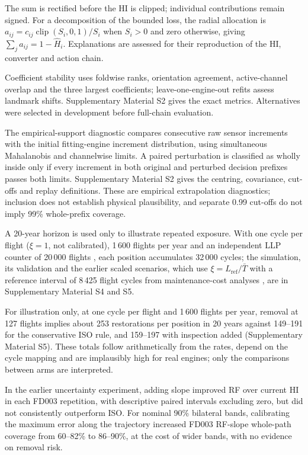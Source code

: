 \documentclass[12pt]{article}
\begin{document}
The sum is rectified before the HI is clipped; individual contributions remain signed. For a decomposition of the bounded loss, the radial allocation is $a_{ij}=c_{ij}\operatorname{clip}(S_i,0,1)/S_i$ when $S_i>0$ and zero otherwise, giving $\sum_j a_{ij}=1-\widehat H_i$. Explanations are assessed for their reproduction of the HI, converter and action chain.

Coefficient stability uses foldwise ranks, orientation agreement, active-channel overlap and the three largest coefficients; leave-one-engine-out refits assess landmark shifts. Supplementary Material S2 gives the exact metrics. Alternatives were selected in development before full-chain evaluation.

The empirical-support diagnostic compares consecutive raw sensor increments with the initial fitting-engine increment distribution, using simultaneous Mahalanobis \cite{Mahalanobis1936} and channelwise limits. A paired perturbation is classified as wholly inside only if every increment in both original and perturbed decision prefixes passes both limits. Supplementary Material S2 gives the centring, covariance, cut-offs and replay definitions. These are empirical extrapolation diagnostics; inclusion does not establish physical plausibility, and separate 0.99 cut-offs do not imply 99\% whole-prefix coverage.

A 20-year horizon is used only to illustrate repeated exposure. With one cycle per flight ($\xi=1$, not calibrated), 1\,600 flights per year and an independent LLP counter of 20\,000 flights \cite{AC33701}, each position accumulates 32\,000 cycles; the simulation, its validation and the earlier scaled scenarios, which use $\xi=L_{\mathrm{ref}}/\bar T$ with a reference interval of 8\,425 flight cycles from maintenance-cost analyses \cite{AC2003,AC2005,AC2019}, are in Supplementary Material S4 and S5.

For illustration only, at one cycle per flight and 1\,600 flights per year, removal at 127 flights implies about 253 restorations per position in 20 years against 149--191 for the conservative ISO rule, and 159--197 with inspection added (Supplementary Material S5). These totals follow arithmetically from the rates, depend on the cycle mapping and are implausibly high for real engines; only the comparisons between arms are interpreted.

In the earlier uncertainty experiment, adding slope improved RF over current HI in each FD003 repetition, with descriptive paired intervals excluding zero, but did not consistently outperform ISO. For nominal 90\% bilateral bands, calibrating the maximum error along the trajectory increased FD003 RF-slope whole-path coverage from 60--82\% to 86--90\%, at the cost of wider bands, with no evidence on removal risk.
\end{document}
